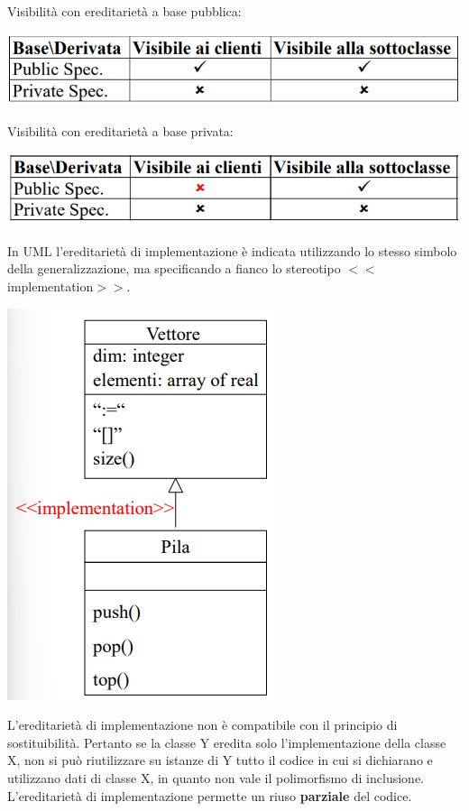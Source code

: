 \documentclass{article}
\begin{document}
	Visibilità con ereditarietà a base pubblica:
	\begin{center}
		\includegraphics[scale=0.7]{assets/ereditarieta_base_pubblica.png}
	\end{center}
	Visibilità con ereditarietà a base privata:
	\begin{center}
		\includegraphics[scale=0.7]{assets/ereditarieta_base_privata.png}
	\end{center}
	In UML l'ereditarietà di implementazione è indicata utilizzando lo stesso simbolo della generalizzazione, ma specificando a fianco lo stereotipo $<<$implementation$>>$.
	\begin{center}
		\includegraphics[scale=0.7]{assets/ereditarieta_impl.png}
	\end{center}
	L'ereditarietà di implementazione non è compatibile con il principio di sostituibilità. Pertanto se la classe Y eredita solo l'implementazione della classe X, non si può riutilizzare su istanze di Y tutto il codice in cui si dichiarano e utilizzano dati di classe X, in quanto non vale il polimorfismo di inclusione.
	\vspace{\baselineskip} \\
	L'ereditarietà di implementazione permette un riuso \textbf{parziale} del codice.
\end{document}

